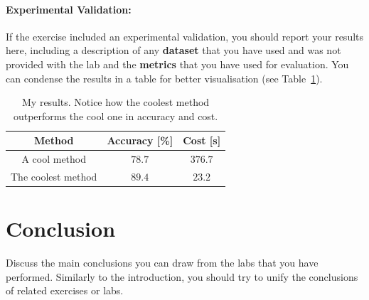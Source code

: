 \documentclass[twocolumn]{article}
\begin{document}
\paragraph{Experimental Validation:} If the exercise included an experimental validation, you should report your results here, including a description of any \textbf{dataset} that you have used and was not provided with the lab and the \textbf{metrics} that you have used for evaluation. You can condense the results in a table for better visualisation (see Table~\ref{tab:results}).

\begin{table}
\begin{center}
\begin{tabular}{|c||c|c|}
\hline
Method & Accuracy [\%] & Cost [s] \\ 
\hline
\hline
A cool method & $78.7$ & $376.7$ \\ 
\hline
The coolest method & $89.4$ & $23.2$ \\ 
\hline
\end{tabular}
\end{center}
\caption{My results. Notice how the coolest method outperforms the cool one in accuracy and cost.}
\label{tab:results}
\end{table}

\section{Conclusion}
Discuss the main conclusions you can draw from the labs that you have performed. Similarly to the introduction, you should try to unify the conclusions of related exercises or labs.


\printbibliography
\end{document}
